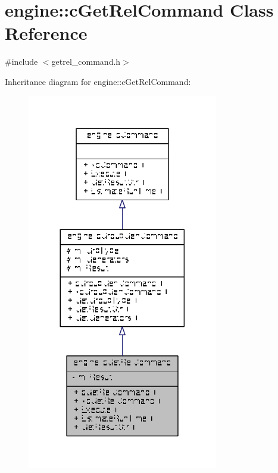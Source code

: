 \hypertarget{classengine_1_1cGetRelCommand}{\section{engine\-:\-:c\-Get\-Rel\-Command Class Reference}
\label{classengine_1_1cGetRelCommand}
}


{\ttfamily \#include $<$getrel\-\_\-command.\-h$>$}



Inheritance diagram for engine\-:\-:c\-Get\-Rel\-Command\-:
\nopagebreak
\begin{figure}[H]
\begin{center}
\leavevmode
\includegraphics[width=236pt]{classengine_1_1cGetRelCommand__inherit__graph}
\end{center}
\end{figure}


